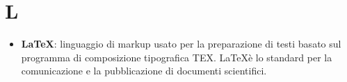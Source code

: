 \section{L}
\begin{itemize} 
	\item \textbf{\LaTeX}: linguaggio di markup usato per la preparazione di testi basato sul programma di composizione tipografica TEX. \LaTeX è lo standard per la comunicazione e la pubblicazione di documenti scientifici.	
\end{itemize}